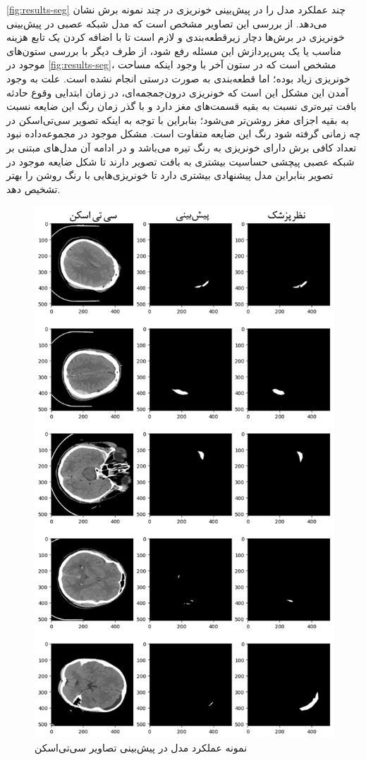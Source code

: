\autoref{fig:results-seg}
چند عملکرد مدل را در پیش‌بینی خونریزی در چند نمونه برش نشان می‌دهد. از بررسی این تصاویر مشخص است که مدل شبکه عصبی در پیش‌بینی خونریزی در برش‌ها دچار زیرقطعه‌بندی 
و لازم است تا با اضافه کردن یک تابع هزینه مناسب یا یک پس‌پردازش این مسئله رفع شود، از طرف دیگر با بررسی ستون‌های موجود در
\autoref{fig:results-seg}،
مشخص است که در ستون آخر با وجود اینکه مساحت خونریزی زیاد بوده؛ اما قطعه‌بندی به صورت درستی انجام نشده است. علت به وجود آمدن این مشکل این است که خونریزی درون‌‌جمجمه‌ای، در زمان ابتدایی وقوع حادثه بافت تیره‌تری نسبت به بقیه قسمت‌های مغز دارد و با گذر زمان رنگ این ضایعه نسبت به بقیه اجزای مغز روشن‌تر می‌شود؛ بنابراین با توجه به اینکه تصویر سی‌تی‌اسکن در چه زمانی گرفته شود رنگ این ضایعه متفاوت است. مشکل موجود در مجموعه‌داده 
نبود تعداد کافی برش دارای خونریزی به رنگ تیره می‌باشد و در ادامه آن مدل‌های مبتنی بر شبکه عصبی پیچشی حساسیت بیشتری به بافت تصویر دارند تا شکل ضایعه موجود در تصویر بنابراین مدل پیشنهادی 
بیشتری دارد تا خونریزی‌هایی با رنگ روشن را بهتر تشخیص دهد.



\begin{figure}[h]
\centering
\includegraphics[width=0.85\linewidth]{Images/Chapter3/results.jpg}
\caption{نمونه عملکرد مدل در پیش‌بینی تصاویر سی‌تی‌اسکن}
\label{fig:results-seg}
\end{figure}
  